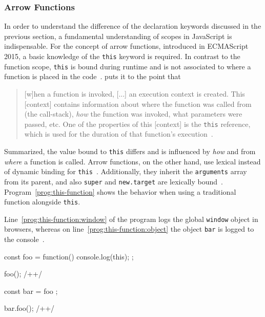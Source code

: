 
\subsubsection{Arrow Functions}

In order to understand the difference of the declaration keywords discussed in the previous section, a fundamental understanding of scopes in JavaScript is indispensable. For the concept of arrow functions, introduced in ECMAScript 2015, a basic knowledge of the \texttt{this} keyword is required. In contrast to the function scope, \texttt{this} is bound during runtime and is not associated to where a function is placed in the code~\cite[p.~9]{YDKJS:ThisAndObjectPrototypes:Simpson:2015}. \citeauthor{YDKJS:ThisAndObjectPrototypes:Simpson:2015} puts it to the point that
\begin{quote}
  [w]hen a function is invoked, [...] an execution context is created. This [context] contains information about where the function was called from (the call-stack), \emph{how} the function was invoked, what parameters were passed, etc. One of the properties of this [context] is the \texttt{this} reference, which is used for the duration of that function’s execution~\cite[p.~1]{YDKJS:ThisAndObjectPrototypes:Simpson:2015}.
\end{quote}
Summarized, the value bound to \texttt{this} differs and is influenced by \emph{how} and from \emph{where} a function is called. Arrow functions, on the other hand, use lexical instead of dynamic binding for \texttt{this}~\cite[p.~58]{YDKJS:ES6AndBeyond:Simpson:2015}. Additionally, they inherit the \texttt{arguments} array from its parent, and also \texttt{super} and \texttt{new.target} are lexically bound~\cite[p.~59]{YDKJS:ES6AndBeyond:Simpson:2015}. Program~\ref{prog:this-function} shows the behavior when using a traditional function alongside \texttt{this}.
\begin{program}
\caption{Line~\ref{prog:this-function:window} of the program logs the global \texttt{window} object in browsers, whereas on line~\ref{prog:this-function:object} the object \texttt{bar} is logged to the console~\cite[p.~18]{TypeScriptBook:Syed:2017}.}
\label{prog:this-function}
\begin{JsCode}
const foo = function() {
  console.log(this);
};

foo(); /+\label{prog:this-function:window}+/

const bar = { foo };

bar.foo(); /+\label{prog:this-function:object}+/
\end{JsCode}
\end{program}

